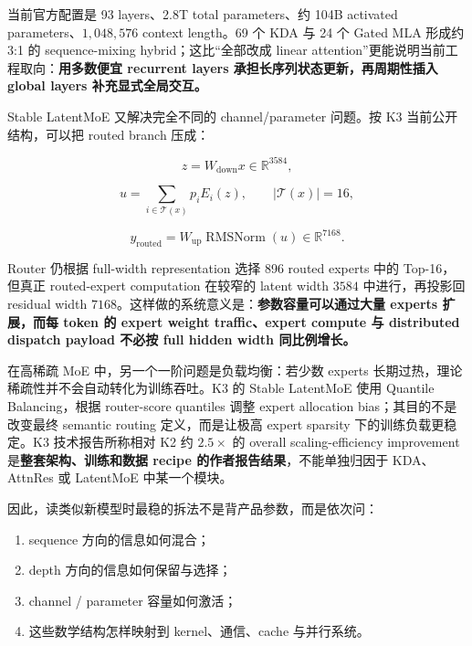 \documentclass[profile=standard,twoside=false]{ipara-handbook}
\begin{document}
\begin{handbookdiagram}
\centering

\end{handbookdiagram}

当前官方配置是 93 layers、2.8T total parameters、约 104B activated parameters、$1{,}048{,}576$ context length。69 个 KDA 与 24 个 Gated MLA 形成约 3:1 的 sequence-mixing hybrid；这比“全部改成 linear attention”更能说明当前工程取向：\textbf{用多数便宜 recurrent layers 承担长序列状态更新，再周期性插入 global layers 补充显式全局交互。}

Stable LatentMoE 又解决完全不同的 channel/parameter 问题。按 K3 当前公开结构，可以把 routed branch 压成：

$$
z=W_{\mathrm{down}}x\in\mathbb{R}^{3584},
$$

$$
u
=\sum_{i\in\mathcal{T}(x)}p_iE_i(z),
\qquad |\mathcal{T}(x)|=16,
$$

$$
y_{\mathrm{routed}}
=W_{\mathrm{up}}\operatorname{RMSNorm}(u)
\in\mathbb{R}^{7168}.
$$

Router 仍根据 full-width representation 选择 896 routed experts 中的 Top-16，但真正 routed-expert computation 在较窄的 latent width $3584$ 中进行，再投影回 residual width $7168$。这样做的系统意义是：\textbf{参数容量可以通过大量 experts 扩展，而每 token 的 expert weight traffic、expert compute 与 distributed dispatch payload 不必按 full hidden width 同比例增长。}

在高稀疏 MoE 中，另一个一阶问题是负载均衡：若少数 experts 长期过热，理论稀疏性并不会自动转化为训练吞吐。K3 的 Stable LatentMoE 使用 Quantile Balancing，根据 router-score quantiles 调整 expert allocation bias；其目的不是改变最终 semantic routing 定义，而是让极高 expert sparsity 下的训练负载更稳定。K3 技术报告所称相对 K2 约 $2.5\times$ 的 overall scaling-efficiency improvement 是\textbf{整套架构、训练和数据 recipe 的作者报告结果}，不能单独归因于 KDA、AttnRes 或 LatentMoE 中某一个模块。

因此，读类似新模型时最稳的拆法不是背产品参数，而是依次问：

\begin{enumerate}
  \item sequence 方向的信息如何混合；
  \item depth 方向的信息如何保留与选择；
  \item channel / parameter 容量如何激活；
  \item 这些数学结构怎样映射到 kernel、通信、cache 与并行系统。
\end{enumerate}
\end{document}
